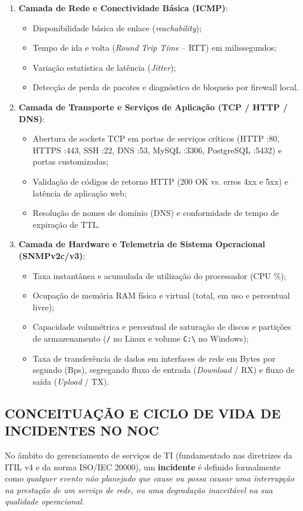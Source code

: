 \documentclass[12pt,a4paper]{article}
\begin{document}
\begin{enumerate}[leftmargin=1.25cm]
\item \textbf{Camada de Rede e Conectividade Básica (ICMP)}:
  \begin{itemize}
  \item Disponibilidade básica de enlace (\textit{reachability});
  \item Tempo de ida e volta (\textit{Round Trip Time} -- RTT) em milissegundos;
  \item Variação estatística de latência (\textit{Jitter});
  \item Detecção de perda de pacotes e diagnóstico de bloqueio por firewall local.
  \end{itemize}
\item \textbf{Camada de Transporte e Serviços de Aplicação (TCP / HTTP / DNS)}:
  \begin{itemize}
  \item Abertura de sockets TCP em portas de serviços críticos (HTTP :80, HTTPS :443, SSH :22, DNS :53, MySQL :3306, PostgreSQL :5432) e portas customizadas;
  \item Validação de códigos de retorno HTTP (200 OK vs. erros 4xx e 5xx) e latência de aplicação web;
  \item Resolução de nomes de domínio (DNS) e conformidade de tempo de expiração de TTL.
  \end{itemize}
\item \textbf{Camada de Hardware e Telemetria de Sistema Operacional (SNMPv2c/v3)}:
  \begin{itemize}
  \item Taxa instantânea e acumulada de utilização do processador (CPU \%);
  \item Ocupação de memória RAM física e virtual (total, em uso e percentual livre);
  \item Capacidade volumétrica e percentual de saturação de discos e partições de armazenamento (\texttt{/} no Linux e volume \texttt{C:\textbackslash} no Windows);
  \item Taxa de transferência de dados em interfaces de rede em Bytes por segundo (Bps), segregando fluxo de entrada (\textit{Download} / RX) e fluxo de saída (\textit{Upload} / TX).
  \end{itemize}
\end{enumerate}

\subsection{CONCEITUAÇÃO E CICLO DE VIDA DE INCIDENTES NO NOC}
No âmbito do gerenciamento de serviços de TI (fundamentado nas diretrizes da ITIL v4 \cite{axelos2019itil} e da norma ISO/IEC 20000), um \textbf{incidente} é definido formalmente como \textit{qualquer evento não planejado que cause ou possa causar uma interrupção na prestação de um serviço de rede, ou uma degradação inaceitável na sua qualidade operacional}.
\end{document}
